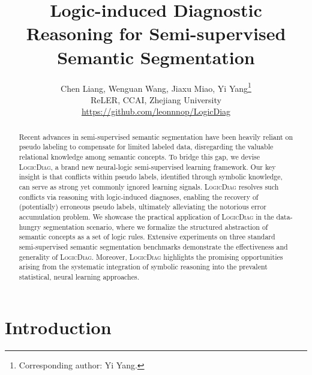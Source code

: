 \documentclass[10pt,twocolumn,letterpaper]{article}
\def\Ours{{\textsc{LogicDiag}}}
\begin{document}
\title{Logic-induced Diagnostic Reasoning for Semi-supervised Semantic Segmentation}

\author{Chen Liang, \quad Wenguan Wang,  \quad Jiaxu Miao, \quad Yi Yang\thanks{Corresponding author: Yi Yang.} \vspace{.5em} \\
  \small{ReLER, CCAI, Zhejiang University} \vspace{.5em} \\
  \small\url{https://github.com/leonnnop/LogicDiag} \vspace{.5em}
}

\maketitle
\ificcvfinal\thispagestyle{empty}\fi


\begin{abstract}
   Recent advances in semi-supervised semantic segmentation have been heavily reliant on pseudo labeling to compensate for limited labeled data, 
   disregarding the valuable relational knowledge among semantic concepts.
   To bridge this gap, we devise {\Ours}, a brand new neural-logic semi-supervised learning framework. Our key insight is that conflicts within pseudo labels, identified through symbolic knowledge, can serve as strong yet commonly ignored learning signals.
   {\Ours} resolves such conflicts via reasoning with logic-induced diagnoses,
   enabling the recovery of (potentially) erroneous pseudo labels, ultimately alleviating the notorious error accumulation problem.
   We showcase the practical application of {\Ours} in the data-hungry segmentation scenario, where we formalize the structured abstraction of semantic concepts as a set of logic rules.
   Extensive experiments on three standard semi-supervised semantic segmentation benchmarks demonstrate the effectiveness and generality of {\Ours}.
   Moreover, {\Ours} highlights the promising opportunities arising from the systematic integration of symbolic reasoning into the prevalent statistical, neural learning approaches.
\end{abstract}


\vspace{.1em}
\section{Introduction}
\label{sec:intro}
\end{document}
